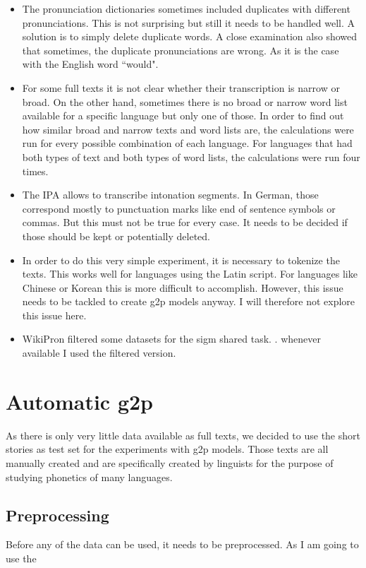 \begin{itemize}
\item The pronunciation dictionaries sometimes included duplicates with different pronunciations. This is not surprising but still it needs to be handled well. A solution is to simply delete duplicate words. A close examination also showed that sometimes, the duplicate pronunciations are wrong. As it is the case with the English word ``would". 
\item For some full texts it is not clear whether their transcription is narrow or broad. On the other hand, sometimes there is no broad or narrow word list available for a specific language but only one of those. In order to find out how similar broad and narrow texts and word lists are, the calculations were run for every possible combination of each language. For languages that had both types of text and both types of word lists, the calculations were run four times. 
\item The IPA allows to transcribe intonation segments. In German, those correspond mostly to punctuation marks like end of sentence symbols or commas. But this must not be true for every case. It needs to be decided if those should be kept or potentially deleted.
\item In order to do this very simple experiment, it is necessary to tokenize the texts. This works well for languages using the Latin script. For languages like Chinese or Korean this is more difficult to accomplish. However, this issue needs to be tackled to create \ac{g2p} models anyway. I will therefore not explore this issue here.
\item WikiPron filtered some datasets for the \ac{sigm} shared task. . whenever available I used the filtered version.
\end{itemize}



\section{Automatic \ac{g2p}}
As there is only very little data available as full texts, we decided to use the short stories as test set for the experiments with \ac{g2p} models. Those texts are all manually created and are specifically created by linguists for the purpose of studying phonetics of many languages. 

\subsection*{Preprocessing}
Before any of the data can be used, it needs to be preprocessed. As I am going to use the 